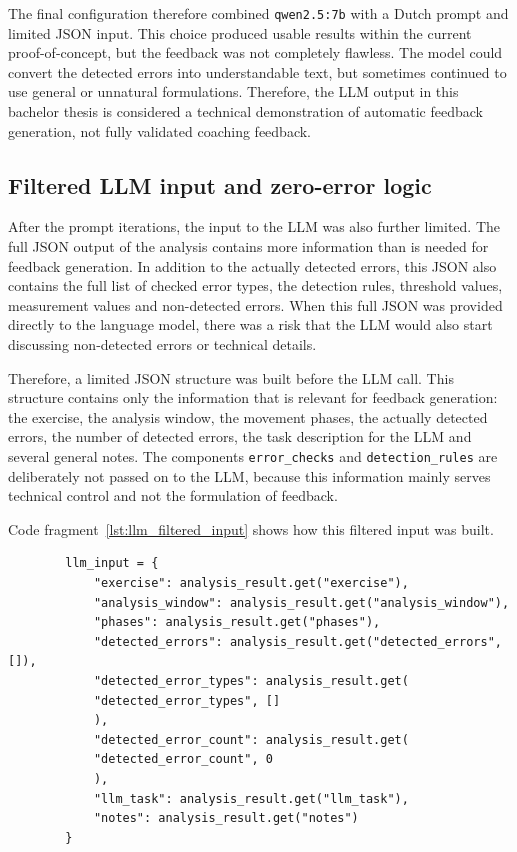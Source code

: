 The final configuration therefore combined \texttt{qwen2.5:7b} with a Dutch prompt and limited JSON input. This choice produced usable results within the current proof-of-concept, but the feedback was not completely flawless. The model could convert the detected errors into understandable text, but sometimes continued to use general or unnatural formulations. Therefore, the LLM output in this bachelor thesis is considered a technical demonstration of automatic feedback generation, not fully validated coaching feedback.

\subsection{Filtered LLM input and zero-error logic}

After the prompt iterations, the input to the LLM was also further limited. The full JSON output of the analysis contains more information than is needed for feedback generation. In addition to the actually detected errors, this JSON also contains the full list of checked error types, the detection rules, threshold values, measurement values and non-detected errors. When this full JSON was provided directly to the language model, there was a risk that the LLM would also start discussing non-detected errors or technical details.

Therefore, a limited JSON structure was built before the LLM call. This structure contains only the information that is relevant for feedback generation: the exercise, the analysis window, the movement phases, the actually detected errors, the number of detected errors, the task description for the LLM and several general notes. The components \texttt{error\_checks} and \texttt{detection\_rules} are deliberately not passed on to the LLM, because this information mainly serves technical control and not the formulation of feedback.

Code fragment~\ref{lst:llm_filtered_input} shows how this filtered input was built.

\begin{listing}[H]
    \begin{verbatim}
        llm_input = {
            "exercise": analysis_result.get("exercise"),
            "analysis_window": analysis_result.get("analysis_window"),
            "phases": analysis_result.get("phases"),
            "detected_errors": analysis_result.get("detected_errors", []),
            "detected_error_types": analysis_result.get(
            "detected_error_types", []
            ),
            "detected_error_count": analysis_result.get(
            "detected_error_count", 0
            ),
            "llm_task": analysis_result.get("llm_task"),
            "notes": analysis_result.get("notes")
        }
    \end{verbatim}
    \caption{Construction of a filtered JSON input for the LLM from \href{https://github.com/Tristanvanspeybroeck/bachelorproef-Methodologie-25-26-Van-Speybroeck-Tristan/blob/main/Methodologie/pose_project/src/generate_feedback.py}{\texttt{generate\_feedback.py}}}
    \label{lst:llm_filtered_input}
\end{listing}

